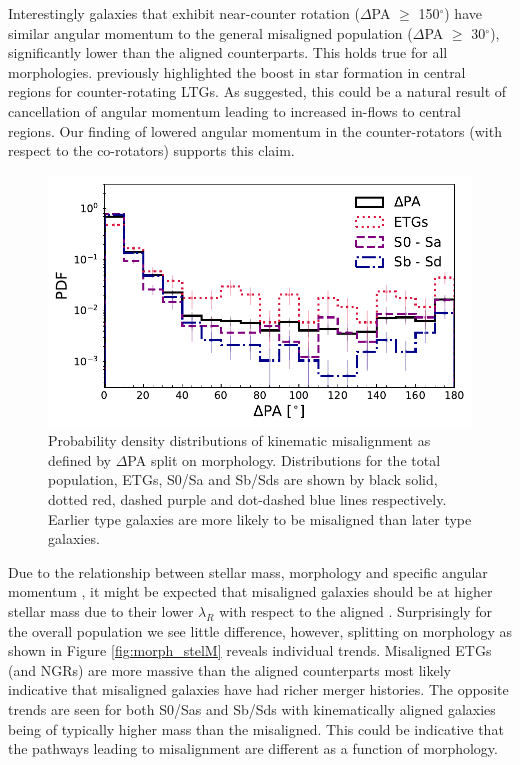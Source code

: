 \documentclass[fleqn,usenatbib]{mnras}
\begin{document}
Interestingly galaxies that exhibit near-counter rotation ($\Delta$PA $\geq$ 150$^{\circ}$) have similar angular momentum to the general misaligned population ($\Delta$PA $\geq$ 30$^{\circ}$), significantly lower than the aligned counterparts. This holds true for all morphologies. \citet{chen2016} previously highlighted the boost in star formation in central regions for counter-rotating LTGs. As suggested, this could be a natural result of cancellation of angular momentum leading to increased in-flows to central regions. Our finding of lowered angular momentum in the counter-rotators (with respect to the co-rotators) supports this claim.

\begin{figure}
	\includegraphics[width=\linewidth]{morph/delPA_morph.pdf}
    \caption{Probability density distributions of kinematic misalignment as defined by $\Delta$PA split on morphology. Distributions for the total population, ETGs, S0/Sa and Sb/Sds are shown by black solid, dotted red, dashed purple and dot-dashed blue lines respectively. Earlier type galaxies are more likely to be misaligned than later type galaxies.}
    \label{fig:morph_PA}
\end{figure}

Due to the relationship between stellar mass, morphology and specific angular momentum \citep[e.g. see;]{cortese2016}, it might be expected that misaligned galaxies should be at higher stellar mass due to their lower $\lambda_{R}$ with respect to the aligned \citep[see also;][]{bryant2019}. Surprisingly for the overall population we see little difference, however, splitting on morphology as shown in Figure \ref{fig:morph_stelM} reveals individual trends. Misaligned ETGs (and NGRs) are more massive than the aligned counterparts most likely indicative that misaligned galaxies have had richer merger histories. The opposite trends are seen for both S0/Sas and Sb/Sds with kinematically aligned galaxies being of typically higher mass than the misaligned. This could be indicative that the pathways leading to misalignment are different as a function of morphology.
\end{document}
